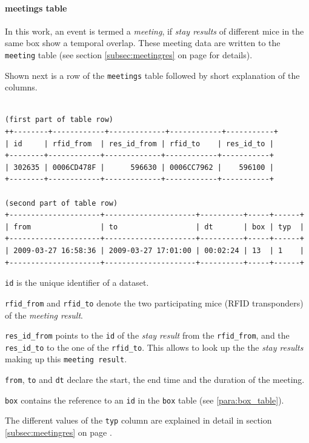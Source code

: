 \paragraph{meetings table}
\label{para:meetings_table}

In this work, an event is termed a \textit{meeting}, if \textit{stay results} of different mice in the same box show a temporal overlap. These meeting data are written to the \lstinline|meeting| table (see section \ref{subsec:meetingres} on page \pageref{subsec:meetingres} for details).

Shown next is a row of the \lstinline|meetings| table followed by short explanation of the columns.
\codescript
\begin{lstlisting}[frame=none]

(first part of table row)
++--------+------------+-------------+------------+-----------+
| id     | rfid_from  | res_id_from | rfid_to    | res_id_to |
+--------+------------+-------------+------------+-----------+
| 302635 | 0006CD478F |      596630 | 0006CC7962 |    596100 | 
+--------+------------+-------------+------------+-----------+

(second part of table row)
+---------------------+---------------------+----------+-----+------+
| from                | to                  | dt       | box | typ  |
+---------------------+---------------------+----------+-----+------+
| 2009-03-27 16:58:36 | 2009-03-27 17:01:00 | 00:02:24 | 13  | 1    |
+---------------------+---------------------+----------+-----+------+
\end{lstlisting}

\begin{mydesc}
	\item \lstinline|id| is the unique identifier of a dataset.
	\item \lstinline|rfid_from| and \lstinline|rfid_to| denote the two participating mice (\ac{RFID} transponders) of the \textit{meeting result}.
	\item \lstinline|res_id_from| points to the \lstinline|id| of the \textit{stay result} from the \lstinline|rfid_from|, and the \lstinline|res_id_to| to the one of the \lstinline|rfid_to|. This allows to look up the the \textit{stay results} making up this \lstinline|meeting result|.
	\item \lstinline|from|, \lstinline|to| and \lstinline|dt| declare the start, the end time and the duration of the meeting.
	\item \lstinline|box| contains the reference to an \lstinline|id| in the \lstinline|box| table (see \ref{para:box_table}).
	\item The different values of the \lstinline|typ| column are explained in detail in section \ref{subsec:meetingres} on page \pageref{subsec:meetingres}.
\end{mydesc}


